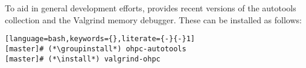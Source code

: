 To aid in general development efforts, \OHPC{} provides recent versions of the \GNU{}
autotools collection and the Valgrind memory debugger. These can be installed as follows:

\begin{lstlisting}[language=bash,keywords={},literate={-}{-}1]
[master]# (*\groupinstall*) ohpc-autotools
[master]# (*\install*) valgrind-ohpc
\end{lstlisting}
